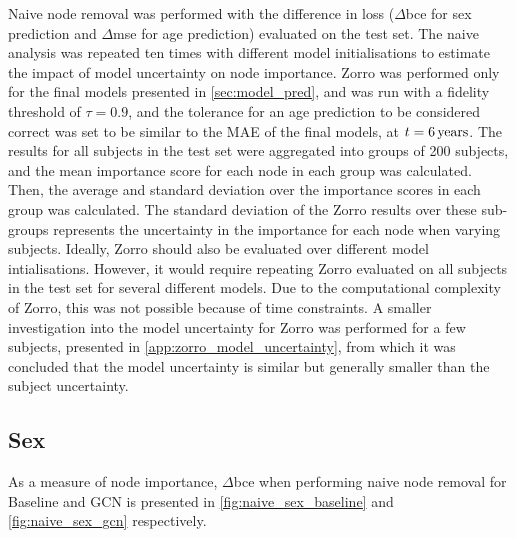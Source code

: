 Naive node removal was performed with the difference in loss ($\Delta$\acrshort{bce} for sex prediction and $\Delta$\acrshort{mse} for age prediction) evaluated on the test set. The naive analysis was repeated ten times with different model initialisations to estimate the impact of model uncertainty on node importance. Zorro was performed only for the final models presented in \cref{sec:model_pred}, and was run with a fidelity threshold of $\tau=0.9$, and the tolerance for an age prediction to be considered correct was set to be similar to the MAE of the final models, at $t=6\rm\,years$. The results for all subjects in the test set were aggregated into groups of 200 subjects, and the mean importance score for each node in each group was calculated. Then, the average and standard deviation over the importance scores in each group was calculated. The standard deviation of the Zorro results over these sub-groups represents the uncertainty in the importance for each node when varying subjects. Ideally, Zorro should also be evaluated over different model intialisations. However, it would require repeating Zorro evaluated on all subjects in the test set for several different models. Due to the computational complexity of Zorro, this was not possible because of time constraints. A smaller investigation into the model uncertainty for Zorro was performed for a few subjects, presented in \cref{app:zorro_model_uncertainty}, from which it was concluded that the model uncertainty is similar but generally smaller than the subject uncertainty. 

\subsection{Sex}
\label{sec:results_analysis_sex}
As a measure of node importance, $\Delta$\acrshort{bce} when performing naive node removal for Baseline and GCN is presented in \cref{fig:naive_sex_baseline} and \cref{fig:naive_sex_gcn} respectively.


